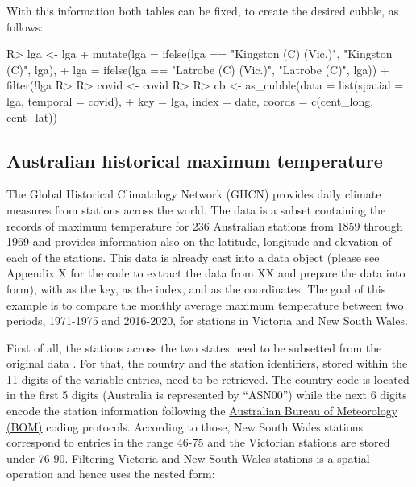 \documentclass[
]{jss}
\begin{document}
With this information both tables can be fixed, to create the desired cubble, as follows:

\begin{CodeChunk}
\begin{CodeInput}
R> lga <- lga %
+   mutate(lga = ifelse(lga == "Kingston (C) (Vic.)", "Kingston (C)", lga),
+          lga = ifelse(lga == "Latrobe (C) (Vic.)", "Latrobe (C)", lga)) %
+   filter(!lga %
R> 
R> covid <- covid %
R> 
R> cb <- as_cubble(data = list(spatial = lga, temporal = covid),
+                 key = lga, index = date, coords = c(cent_long, cent_lat))
\end{CodeInput}
\end{CodeChunk}

\hypertarget{australian-historical-maximum-temperature}{%
\subsection{Australian historical maximum temperature}\label{australian-historical-maximum-temperature}}

The Global Historical Climatology Network (GHCN) provides daily climate measures from stations across the world. The data  is a subset containing the records of maximum temperature for 236 Australian stations from 1859 through 1969 and provides information also on the latitude, longitude and elevation of each of the stations. This data is already cast into a  data object (please see Appendix X for the code to extract the data from XX and prepare the data into  form), with  as the key,  as the index, and  as the coordinates. The goal of this example is to compare the monthly average maximum temperature between two periods, 1971-1975 and 2016-2020, for stations in Victoria and New South Wales.

First of all, the stations across the two states need to be subsetted from the original data . For that, the country and the station identifiers, stored within the 11 digits of the  variable entries, need to be retrieved. The country code is located in the first 5 digits (Australia is represented by ``ASN00'') while the next 6 digits encode the station information following the \href{http://www.bom.gov.au/climate/cdo/about/site-num.shtml}{Australian Bureau of Meteorology (BOM)} coding protocols. According to those, New South Wales stations correspond to entries in the range 46-75 and the Victorian stations are stored under 76-90. Filtering Victoria and New South Wales stations is a spatial operation and hence uses the  nested form:
\end{document}
